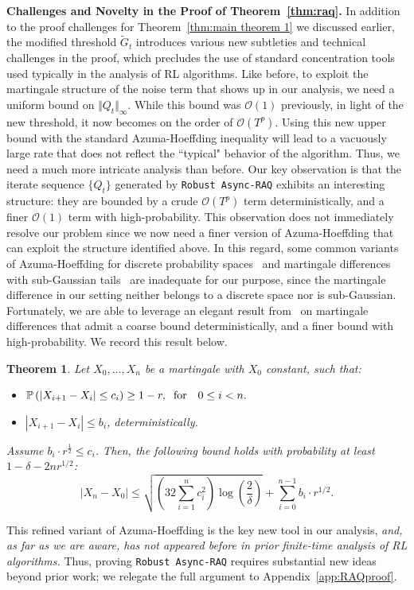 \documentclass{article}
\newcommand{\mc}{\mathcal}
\newtheorem{theorem}{Theorem}
\begin{document}
\textbf{Challenges and  Novelty in the Proof of Theorem~\ref{thm:raq}.} In addition to the proof challenges for Theorem~\ref{thm:main theorem 1} we discussed earlier, the modified threshold $\tilde{G}_t$ introduces various new subtleties and technical challenges in the proof, which precludes the use of standard concentration tools used typically in the analysis of RL algorithms. Like before, to exploit the martingale structure of the noise term that shows up in our analysis, we need a uniform bound on $\Vert Q_t \Vert_{\infty}.$ While this bound was $\mc{O}(1)$ previously, in light of the new threshold, it now becomes on the order of $\mc{O}(T^p)$. Using this new upper bound with the standard Azuma-Hoeffding inequality will lead to a vacuously large rate that does not reflect the ``typical" behavior of the algorithm. Thus, we need a much more intricate analysis than before. Our key observation is that the iterate sequence $\{Q_t\}$ generated by \texttt{Robust Async-RAQ} exhibits an interesting structure: they are bounded by a crude $\mc{O}(T^p)$ term deterministically, and a finer $\mc{O}(1)$ term with high-probability. This observation does not immediately resolve our problem since we now need a finer version of Azuma-Hoeffding that can exploit the structure identified above. In this regard, some common variants of Azuma-Hoeffding for discrete probability spaces~\cite{chung2006concentration} and martingale differences with sub-Gaussian tails~\cite{shamir2011variant} are inadequate for our purpose, since the martingale difference in our setting neither belongs to a discrete space nor is sub-Gaussian. Fortunately, we are able to leverage an elegant result from~\citet{Shamir1987} on martingale differences that admit a coarse bound deterministically, and a finer bound with high-probability. We record this result below. 
\begin{theorem} \cite{Shamir1987}\label{theorem:1986result}
    Let \( X_0, \ldots, X_n \) be a martingale with \( X_0 \) constant, such that:
    \begin{itemize}
        \item[(i)] \(\mathbb P\left(|X_{i+1}-X_i|\le c_i\right)\ge 1-r ,\hspace{2mm} \text{for} \quad 0\le i<n.\)
        \item[(ii)] \( |X_{i+1} - X_i| \leq b_i \), deterministically.
    \end{itemize}
    Assume \(b_i \cdot r^{\frac{1}{2}} \le c_i\). Then, the following bound holds with probability at least \(1-\delta-2n r^{1/2}\):
    \begin{equation}\label{eqn:prob_variant_Ah}
        |X_n - X_0| \leq \sqrt{\left(32\sum_{i=1}^{n} c_i^2\right)\log\left(\frac{2}{\delta}\right)} + \sum_{i=0}^{n-1} b_i \cdot r^{1/2}.
    \end{equation}
\end{theorem}
This refined variant of Azuma-Hoeffding is the key new tool in our analysis, \emph{and, as far as we are aware, has not appeared before in prior finite-time analysis of RL algorithms.} Thus, proving \texttt{Robust Async-RAQ} requires substantial new ideas beyond prior work; we relegate the full argument to Appendix~\ref{app:RAQproof}. 
\vspace{-3mm}
\end{document}
